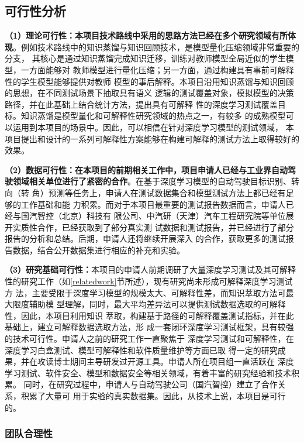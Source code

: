 \subsection{可行性分析}

\textbf{（1）理论可行性：本项目技术路线中采用的思路方法已经在多个研究领域有所体
现}。例如技术路线中的知识蒸馏与知识回顾技术，是模型量化压缩领域非常重要的分支，
其核心是通过知识蒸馏完成知识迁移，训练对教师模型全局近似的学生模型，一方面能够对
教师模型进行量化压缩；另一方面，通过构建具有事前可解释性的学生模型能够提供对教师
模型的事后解释。本项目沿用知识蒸馏与知识回顾的思想，在不同测试场景下抽取具有语义
逻辑的测试覆盖对象，模拟模型的决策路径，并在此基础上结合统计方法，提出具有可解释
性的深度学习测试覆盖目标。知识蒸馏是模型量化和可解释性研究领域的热点之一，有较多
的成熟模型可以运用到本项目的场景中。因此，可以相信在针对深度学习模型的测试领域，
本项目提出和设计的一系列可解释性方案能够在构建可解释的测试方法上取得较好的效果。

\textbf{（2）数据可行性：在本项目的前期相关工作中，项目申请人已经与工业界自动驾
驶领域相关单位进行了紧密的合作}。在基于深度学习模型的自动驾驶目标识别、转向（转
角）预测等任务上，申请人在测试数据集合和模型测试方法上都已经有足够的工作基础和能
力积累。而对于本项目最重要的测试报告数据而言，申请人已经与国汽智控（北京）科技有
限公司、中汽研（天津）汽车工程研究院等单位展开实质性合作，已经获取到了部分真实测
试数据和测试报告，并已经进行了部分报告的分析和总结。后期，申请人还将继续开展深入
的合作，获取更多的测试报告数据，结合公开数据集进行相应的补充和实验。

\textbf{（3）研究基础可行性：}本项目的申请人前期调研了大量深度学习测试及其可解释
性的研究工作（如\ref{relatedwork}节所述），现有研究尚未形成可解释深度学习测试方
法，主要受限于深度学习模型的规模太大、可解释性差，而知识萃取方法可最大限度辅助模
型理解，同时，最大平均差异法可以提供测试数据选取的可解释性，因此，本项目利用知识
萃取，构建基于路径的可解释覆盖测试指标，并在此基础上，建立可解释数据选取方法，形
成一套闭环深度学习测试框架，具有较强的技术可行性。申请人之前的研究工作一直聚焦于
深度学习测试和可解释性，在深度学习白盒测试、模型可解释性和软件质量维护等方面已取
得一定的研究成果，并在攻读博士期间主导研发过开源工具。申请人所在项目组一直活跃在
深度学习测试、软件安全、模型和数据安全等相关领域，有着丰富的研究经验和技术积累。
同时，在研究过程中，申请人与自动驾驶公司（国汽智控）建立了合作关系，积累了大量可
用于实验的真实数据集。因此，从技术上说，本项目是可行的。

\iffalse
\subsubsection{团队合理性}

